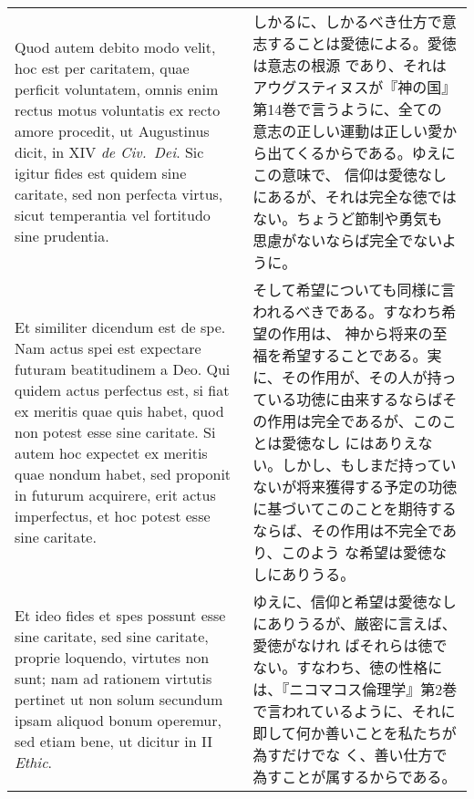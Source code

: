 \documentclass[10pt]{jsarticle}
\begin{document}
\begin{longtable}{p{21em}p{21em}}
\\


 Quod autem debito modo velit, hoc est per caritatem, quae perficit
 voluntatem, omnis enim rectus motus voluntatis ex recto amore
 procedit, ut Augustinus dicit, in XIV {\itshape de Civ.~Dei}. Sic
 igitur fides est quidem sine caritate, sed non perfecta virtus, sicut
 temperantia vel fortitudo sine prudentia.

&

 しかるに、しかるべき仕方で意志することは愛徳による。愛徳は意志の根源
 であり、それはアウグスティヌスが『神の国』第14巻で言うように、全ての
 意志の正しい運動は正しい愛から出てくるからである。ゆえにこの意味で、
 信仰は愛徳なしにあるが、それは完全な徳ではない。ちょうど節制や勇気も
 思慮がないならば完全でないように。

\\


 Et similiter dicendum est de spe. Nam actus spei est expectare
 futuram beatitudinem a Deo. Qui quidem actus perfectus est, si fiat
 ex meritis quae quis habet, quod non potest esse sine caritate. Si
 autem hoc expectet ex meritis quae nondum habet, sed proponit in
 futurum acquirere, erit actus imperfectus, et hoc potest esse sine
 caritate.

 &

 そして希望についても同様に言われるべきである。すなわち希望の作用は、
 神から将来の至福を希望することである。実に、その作用が、その人が持っ
 ている功徳に由来するならばその作用は完全であるが、このことは愛徳なし
 にはありえない。しかし、もしまだ持っていないが将来獲得する予定の功徳
 に基づいてこのことを期待するならば、その作用は不完全であり、このよう
 な希望は愛徳なしにありうる。


\\


 Et ideo fides et spes possunt esse sine caritate, sed sine caritate,
 proprie loquendo, virtutes non sunt; nam ad rationem virtutis
 pertinet ut non solum secundum ipsam aliquod bonum operemur, sed
 etiam bene, ut dicitur in II {\itshape Ethic}.

&

 ゆえに、信仰と希望は愛徳なしにありうるが、厳密に言えば、愛徳がなけれ
 ばそれらは徳でない。すなわち、徳の性格には、『ニコマコス倫理学』第2巻
 で言われているように、それに即して何か善いことを私たちが為すだけでな
 く、善い仕方で為すことが属するからである。

\\




\end{longtable}
\end{document}
